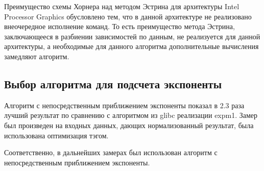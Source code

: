 Преимущество схемы Хорнера над методом Эстрина для архитектуры \foreignlanguage{english}{Intel Processor Graphics} обусловлено тем, что в данной архитектуре не реализовано внеочередное исполнение команд.
То есть преимущество метода Эстрина, заключающееся в разбиении зависимостей по данным, не реализуется для данной архитектуры, а необходимые для данного алгоритма дополнительные вычисления замедляют алгоритм.

\subsection{Выбор алгоритма для подсчета экспоненты}

Алгоритм с непосредственным приближением экспоненты показал в 2.3 раза лучший результат по сравнению с алгоритмом из glibc реализации expm1.
Замер был произведен на входных данных, дающих нормализованный результат, была использована оптимизация тэгом.

Соответственно, в дальнейших замерах был использован алгоритм с непосредственным приближением экспоненты.



